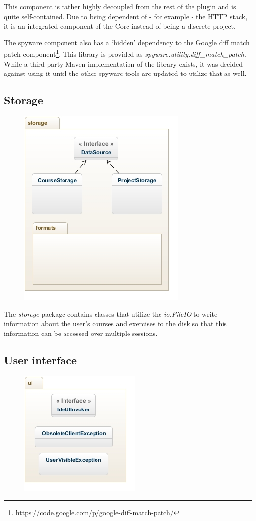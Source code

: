 \documentclass[12pt,a4paper,english,leqno]{article}
\begin{document}
This component is rather highly decoupled from the rest of the plugin and is quite self-contained. Due to being dependent of - for example - the HTTP stack, it is an integrated component of the Core instead of being a discrete project. 

The spyware component also has a `hidden' dependency to the Google diff match patch component\footnote{https://code.google.com/p/google-diff-match-patch/}. This library is provided as \textit{spyware.utility.diff\_match\_patch}. While a third party Maven implementation of the library exists, it was decided against using it until the other spyware tools are updated to utilize that as well.

\subsection{Storage}

\begin{figure}[ht!]
\centering
\includegraphics[scale=1]{img/storage.jpg}
\end{figure}

The \textit{storage} package contains classes that utilize the \textit{io.FileIO} to write information about the user's courses and exercises to the disk so that this information can be accessed over multiple sessions.

\subsection{User interface}

\begin{figure}[ht!]
\centering
\includegraphics[scale=1]{img/ui.jpg}
\end{figure}
\end{document}

